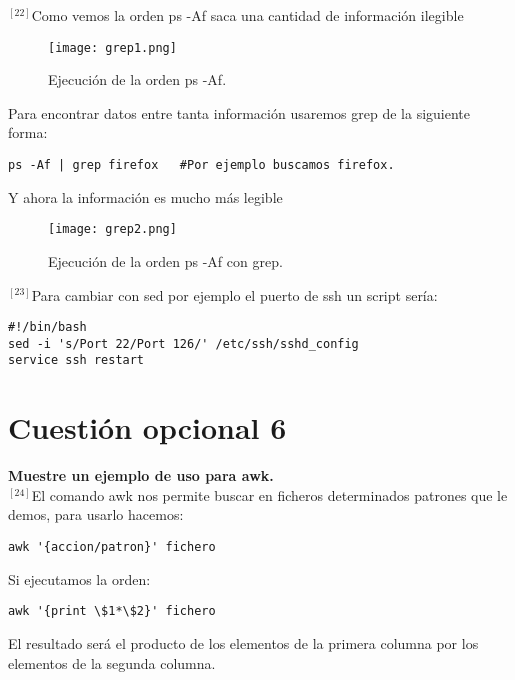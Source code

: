 \documentclass[a4paper, 11pt]{article} %
\begin{document}
\pagebreak

$^{[22]}$Como vemos la orden ps -Af saca una cantidad de información ilegible

\begin{figure}[h]
\centering 
\texttt{[image: grep1.png]} 
\caption{Ejecución de la orden ps -Af.} 
\vspace{-0.5cm}
\label{contexto:figura} 
\end{figure}

Para encontrar datos entre tanta información usaremos grep de la siguiente forma:
\begin{verbatim}
ps -Af | grep firefox   #Por ejemplo buscamos firefox.
\end{verbatim}

Y ahora la información es mucho más legible

\begin{figure}[h]
\centering 
\texttt{[image: grep2.png]} 
\caption{Ejecución de la orden ps -Af con grep.} 
\vspace{-0.5cm}
\label{contexto:figura} 
\end{figure}



$^{[23]}$Para cambiar con sed por ejemplo el puerto de ssh un script sería:
\begin{verbatim}
#!/bin/bash
sed -i 's/Port 22/Port 126/' /etc/ssh/sshd_config 
service ssh restart
\end{verbatim}

\pagebreak

\section{Cuestión opcional 6}
\textbf{Muestre un ejemplo de uso para awk.}\\

$^{[24]}$El comando awk nos permite buscar en ficheros determinados patrones que le demos, para usarlo hacemos:
\begin{verbatim}
awk '{accion/patron}' fichero
\end{verbatim}


Si ejecutamos la orden:
\begin{verbatim}
awk '{print \$1*\$2}' fichero
\end{verbatim}
El resultado será el producto de los elementos de la primera columna por los elementos de la segunda columna.\\
\end{document}
